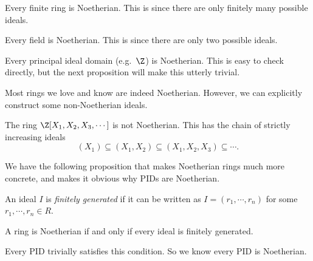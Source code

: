 \documentclass[a4paper]{article}
\begin{document}
\begin{eg}
  Every finite ring is Noetherian. This is since there are only finitely many possible ideals.
\end{eg}

\begin{eg}
  Every field is Noetherian. This is since there are only two possible ideals.
\end{eg}

\begin{eg}
  Every principal ideal domain (e.g.\ $\Z$) is Noetherian. This is easy to check directly, but the next proposition will make this utterly trivial.
\end{eg}

Most rings we love and know are indeed Noetherian. However, we can explicitly construct some non-Noetherian ideals.
\begin{eg}
  The ring $\Z[X_1, X_2, X_3, \cdots]$ is not Noetherian. This has the chain of strictly increasing ideals
  \[
    (X_1) \subseteq (X_1, X_2) \subseteq (X_1, X_2, X_3) \subseteq \cdots.
  \]
\end{eg}

We have the following proposition that makes Noetherian rings much more concrete, and makes it obvious why PIDs are Noetherian.

\begin{defi}
  An ideal $I$ is \emph{finitely generated} if it can be written as $I = (r_1, \cdots, r_n)$ for some $r_1, \cdots, r_n \in R$.
\end{defi}

\begin{prop}
  A ring is Noetherian if and only if every ideal is finitely generated.
\end{prop}
Every PID trivially satisfies this condition. So we know every PID is Noetherian.
\end{document}
